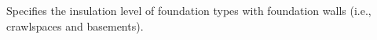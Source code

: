 Specifies the insulation level of foundation types with foundation walls (i.e., crawlspaces and basements).
